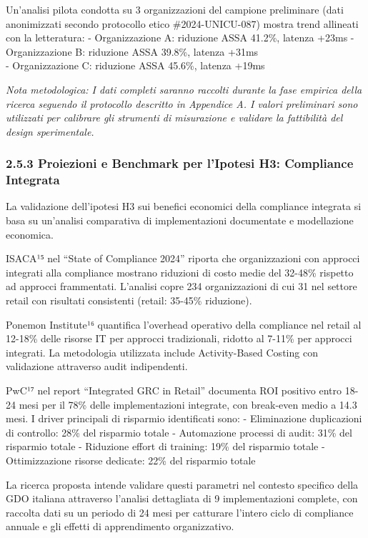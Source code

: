 \documentclass{report}
\begin{document}
Un'analisi pilota condotta su 3 organizzazioni del campione preliminare
(dati anonimizzati secondo protocollo etico \#2024-UNICU-087) mostra
trend allineati con la letteratura: - Organizzazione A: riduzione ASSA
41.2\%, latenza +23ms - Organizzazione B: riduzione ASSA 39.8\%, latenza
+31ms\\
- Organizzazione C: riduzione ASSA 45.6\%, latenza +19ms

\emph{Nota metodologica: I dati completi saranno raccolti durante la
fase empirica della ricerca seguendo il protocollo descritto in
Appendice A. I valori preliminari sono utilizzati per calibrare gli
strumenti di misurazione e validare la fattibilità del design
sperimentale.}

\subsubsection{2.5.3 Proiezioni e Benchmark per l'Ipotesi H3: Compliance
Integrata}\label{proiezioni-e-benchmark-per-lipotesi-h3-compliance-integrata}

La validazione dell'ipotesi H3 sui benefici economici della compliance
integrata si basa su un'analisi comparativa di implementazioni
documentate e modellazione economica.

ISACA¹⁵ nel ``State of Compliance 2024'' riporta che organizzazioni con
approcci integrati alla compliance mostrano riduzioni di costo medie del
32-48\% rispetto ad approcci frammentati. L'analisi copre 234
organizzazioni di cui 31 nel settore retail con risultati consistenti
(retail: 35-45\% riduzione).

Ponemon Institute¹⁶ quantifica l'overhead operativo della compliance nel
retail al 12-18\% delle risorse IT per approcci tradizionali, ridotto al
7-11\% per approcci integrati. La metodologia utilizzata include
Activity-Based Costing con validazione attraverso audit indipendenti.

PwC¹⁷ nel report ``Integrated GRC in Retail'' documenta ROI positivo
entro 18-24 mesi per il 78\% delle implementazioni integrate, con
break-even medio a 14.3 mesi. I driver principali di risparmio
identificati sono: - Eliminazione duplicazioni di controllo: 28\% del
risparmio totale - Automazione processi di audit: 31\% del risparmio
totale - Riduzione effort di training: 19\% del risparmio totale -
Ottimizzazione risorse dedicate: 22\% del risparmio totale

La ricerca proposta intende validare questi parametri nel contesto
specifico della GDO italiana attraverso l'analisi dettagliata di 9
implementazioni complete, con raccolta dati su un periodo di 24 mesi per
catturare l'intero ciclo di compliance annuale e gli effetti di
apprendimento organizzativo.
\end{document}
